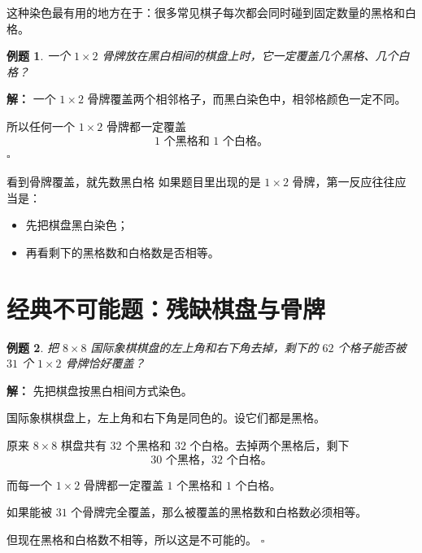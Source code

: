 \documentclass[11pt,a4paper,fontset=fandol]{ctexart}
\theoremstyle{formaltheorem}
\theoremstyle{formalexample}
\newtheorem{example}{例题}[section]
\newenvironment{solution}{\par\noindent\textbf{解：}}{\hfill$\square$\par}
\begin{document}
这种染色最有用的地方在于：很多常见棋子每次都会同时碰到固定数量的黑格和白格。

\begin{example}
一个 $1\times 2$ 骨牌放在黑白相间的棋盘上时，它一定覆盖几个黑格、几个白格？
\end{example}

\begin{solution}
一个 $1\times 2$ 骨牌覆盖两个相邻格子，而黑白染色中，相邻格颜色一定不同。

所以任何一个 $1\times 2$ 骨牌都一定覆盖
\[
1\text{ 个黑格和 }1\text{ 个白格}。
\]
\end{solution}

\begin{skillbox}{看到骨牌覆盖，就先数黑白格}
如果题目里出现的是 $1\times 2$ 骨牌，第一反应往往应当是：
\begin{itemize}
  \item 先把棋盘黑白染色；
  \item 再看剩下的黑格数和白格数是否相等。
\end{itemize}
\end{skillbox}

\begin{center}
\end{center}

\section{经典不可能题：残缺棋盘与骨牌}

\begin{example}
把 $8\times 8$ 国际象棋棋盘的左上角和右下角去掉，剩下的 $62$ 个格子能否被 $31$ 个 $1\times 2$ 骨牌恰好覆盖？
\end{example}

\begin{solution}
先把棋盘按黑白相间方式染色。

国际象棋棋盘上，左上角和右下角是同色的。设它们都是黑格。

原来 $8\times 8$ 棋盘共有 $32$ 个黑格和 $32$ 个白格。去掉两个黑格后，剩下
\[
30\text{ 个黑格，}32\text{ 个白格}。
\]

而每一个 $1\times 2$ 骨牌都一定覆盖 $1$ 个黑格和 $1$ 个白格。

如果能被 $31$ 个骨牌完全覆盖，那么被覆盖的黑格数和白格数必须相等。

但现在黑格和白格数不相等，所以这是不可能的。
\end{solution}
\end{document}
